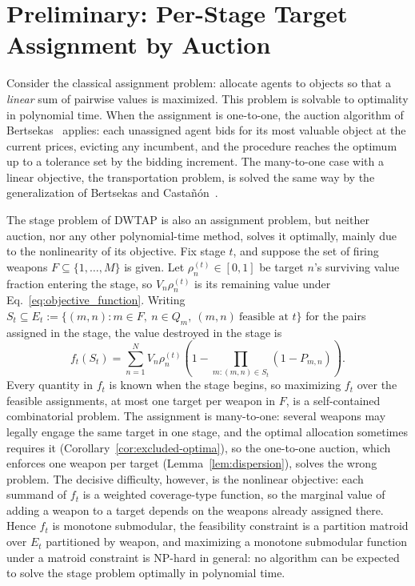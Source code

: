 \section{Preliminary: Per-Stage Target Assignment by Auction}
\label{sec:auction}

Consider the classical assignment problem: allocate agents to objects so that a \emph{linear} sum of pairwise values is maximized. This problem is solvable to optimality in polynomial time. When the assignment is one-to-one, the auction algorithm of Bertsekas~\cite{bertsekas1988auction} applies: each unassigned agent bids for its most valuable object at the current prices, evicting any incumbent, and the procedure reaches the optimum up to a tolerance set by the bidding increment. The many-to-one case with a linear objective, the transportation problem, is solved the same way by the generalization of Bertsekas and Casta\~{n}\'{o}n~\cite{bertsekas1989transportation}.

The stage problem of DWTAP is also an assignment problem, but neither auction, nor any other polynomial-time method, solves it optimally, mainly due to the nonlinearity of its objective. Fix stage $t$, and suppose the set of firing weapons $F \subseteq \{1,\ldots,M\}$ is given. Let $\rho_n^{(t)} \in [0,1]$ be target $n$'s surviving value fraction entering the stage, so $V_n \rho_n^{(t)}$ is its remaining value under Eq.~\eqref{eq:objective_function}. Writing $S_t \subseteq E_t := \{(m,n) : m \in F,\ n \in Q_m,\ (m,n)\ \text{feasible at } t\}$ for the pairs assigned in the stage, the value destroyed in the stage is
\begin{equation}
\label{eq:round-obj}
f_t(S_t) = \sum_{n=1}^N V_n\rho_n^{(t)}\left(1 - \!\!\prod_{m:(m,n)\in S_t}\!\!(1-P_{m,n})\right).
\end{equation}
Every quantity in $f_t$ is known when the stage begins, so maximizing $f_t$ over the feasible assignments, at most one target per weapon in $F$, is a self-contained combinatorial problem. The assignment is many-to-one: several weapons may legally engage the same target in one stage, and the optimal allocation sometimes requires it (Corollary~\ref{cor:excluded-optima}), so the one-to-one auction, which enforces one weapon per target (Lemma~\ref{lem:dispersion}), solves the wrong problem. The decisive difficulty, however, is the nonlinear objective: each summand of $f_t$ is a weighted coverage-type function, so the marginal value of adding a weapon to a target depends on the weapons already assigned there. Hence $f_t$ is monotone submodular, the feasibility constraint is a partition matroid over $E_t$ partitioned by weapon, and maximizing a monotone submodular function under a matroid constraint is NP-hard in general: no algorithm can be expected to solve the stage problem optimally in polynomial time.

